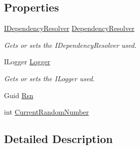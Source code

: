 \subsection*{Properties}
\begin{DoxyCompactItemize}
\item 
\hyperlink{interfaceCqrs_1_1Configuration_1_1IDependencyResolver}{I\+Dependency\+Resolver} \hyperlink{classCqrs_1_1MongoDB_1_1Tests_1_1Integration_1_1MongoDbSnapshotStoreTests_1_1TestAggregate_a117ecb0c2df2f06791397dbc93a11997_a117ecb0c2df2f06791397dbc93a11997}{Dependency\+Resolver}
\begin{DoxyCompactList}\small\item\em Gets or sets the I\+Dependency\+Resolver used. \end{DoxyCompactList}\item 
I\+Logger \hyperlink{classCqrs_1_1MongoDB_1_1Tests_1_1Integration_1_1MongoDbSnapshotStoreTests_1_1TestAggregate_a8486f2a3faec991bcac71d70c7b012e6_a8486f2a3faec991bcac71d70c7b012e6}{Logger}
\begin{DoxyCompactList}\small\item\em Gets or sets the I\+Logger used. \end{DoxyCompactList}\item 
Guid \hyperlink{classCqrs_1_1MongoDB_1_1Tests_1_1Integration_1_1MongoDbSnapshotStoreTests_1_1TestAggregate_a842d2f7ecfd40b19831664f5e7975e6d_a842d2f7ecfd40b19831664f5e7975e6d}{Rsn}
\item 
int \hyperlink{classCqrs_1_1MongoDB_1_1Tests_1_1Integration_1_1MongoDbSnapshotStoreTests_1_1TestAggregate_a260e506ff101c1d919ce83aeff524ddc_a260e506ff101c1d919ce83aeff524ddc}{Current\+Random\+Number}
\end{DoxyCompactItemize}


\subsection{Detailed Description}


